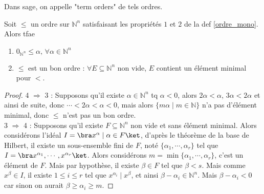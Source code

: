             Dans sage, on appelle "term orders" de tels ordres.
            \begin{prop}
                Soit $\leq$ un ordre sur $\mathbb{N}^n$ satisfaisant les propriétés $1$ et $2$ de la def \ref{ordre_mono}. Alors tfae
                \begin{enumerate}\addtocounter{enumi}{2}
                    \item $0_{\mathbb{N}^n} \leq \alpha ,\, \forall \alpha \in \mathbb{N}^n$
                    \item $\leq$ est un bon ordre : $\forall E \subseteq \mathbb{N}^n$ non vide, $E$ contient un élément minimal pour $<$.
                \end{enumerate}
            \end{prop}
            \begin{proof}
                4 $\Rightarrow$ 3 : Supposons qu'il existe $\alpha \in \mathbb{N}^n$ tq $\alpha < 0$, alors $2\alpha < \alpha$, $3\alpha < 2\alpha$ et ainsi de suite, donc $\cdots < 2\alpha < \alpha < 0$, mais alors $\{m\alpha \mid m \in \mathbb{N}\}$ n'a pas d'élément minimal, donc $\leq$ n'est pas un bon ordre. \\
                3 $\Rightarrow$ 4 : Supposons qu'il existe $F \subseteq \mathbb{N}^n$ non vide et sans élément minimal. Alors considérons l'idéal $I = \bra x^\alpha \mid \alpha \in F \ket$, d'après le théorème de la base de Hilbert, il existe un sous-ensemble fini de $F$, noté $\{\alpha_1, \cdots, \alpha_r\}$ tel que $I = \bra x^{\alpha_1}, \cdots, x^{\alpha_r}\ket$. Alors considérons $m = \min \{\alpha_1, \cdots, \alpha_r\}$, c'est un élément de $F$. Mais par hypothèse, il existe $\beta \in F$ tel que $\beta < s$. Mais comme $x^\beta \in I$, il existe $1 \leq i \leq r$ tel que $x^{\alpha_i} \mid x^\beta$, et ainsi $\beta - \alpha_i \in \mathbb{N}^n$. Mais $\beta - \alpha_i < 0$ car sinon on aurait $\beta \geq \alpha_i \geq m$. 
            \end{proof}

